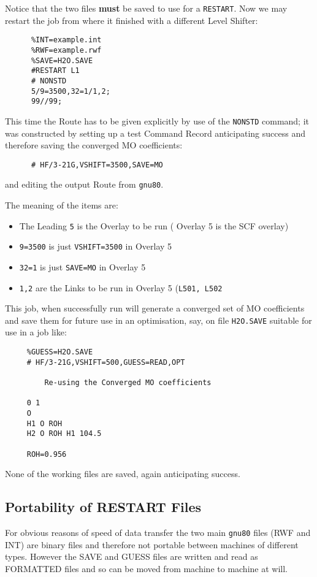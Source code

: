 Notice that the two files {\bf must} be saved to use for a {\tt RESTART}.
\newpage
Now we may restart the job from where it finished with a different
Level Shifter:

\begin{verbatim}
      %INT=example.int
      %RWF=example.rwf
      %SAVE=H2O.SAVE
      #RESTART L1
      # NONSTD
      5/9=3500,32=1/1,2;
      99//99;

\end{verbatim}

This time the Route has to be given explicitly by use of the {\tt NONSTD}
command; it was constructed by setting up a test Command Record anticipating
success and therefore saving the converged MO coefficients:

\begin{verbatim}
      # HF/3-21G,VSHIFT=3500,SAVE=MO
\end{verbatim}

and editing the output Route from {\tt gnu80}.

The meaning of the items are:
\begin{itemize}
\item
The Leading {\tt 5} is the Overlay to be run ( Overlay 5 is the
SCF overlay)
\item
{\tt 9=3500} is just {\tt VSHIFT=3500} in Overlay 5
\item
{\tt 32=1} is just {\tt SAVE=MO} in Overlay 5
\item
{\tt 1,2} are the Links to be run in Overlay 5 ({\tt L501, L502}
\end{itemize}
This job, when successfully run will generate a converged set 
of MO coefficients and save them for future use in an optimisation, say,
on file {\tt H2O.SAVE} suitable for use in a job like:
\newpage
\begin{verbatim}
     %GUESS=H2O.SAVE
     # HF/3-21G,VSHIFT=500,GUESS=READ,OPT

         Re-using the Converged MO coefficients

     0 1
     O
     H1 O ROH
     H2 O ROH H1 104.5

     ROH=0.956

\end{verbatim}
      
None of the working files are saved, again anticipating success.
\subsection{\sf Portability of RESTART Files}
For obvious reasons of speed of data transfer the two main
{\tt gnu80} files (RWF and INT) are binary files and therefore
not portable between machines of different types.
However the SAVE and GUESS files are written and read as
FORMATTED files and so can be moved from machine to
machine at will.

